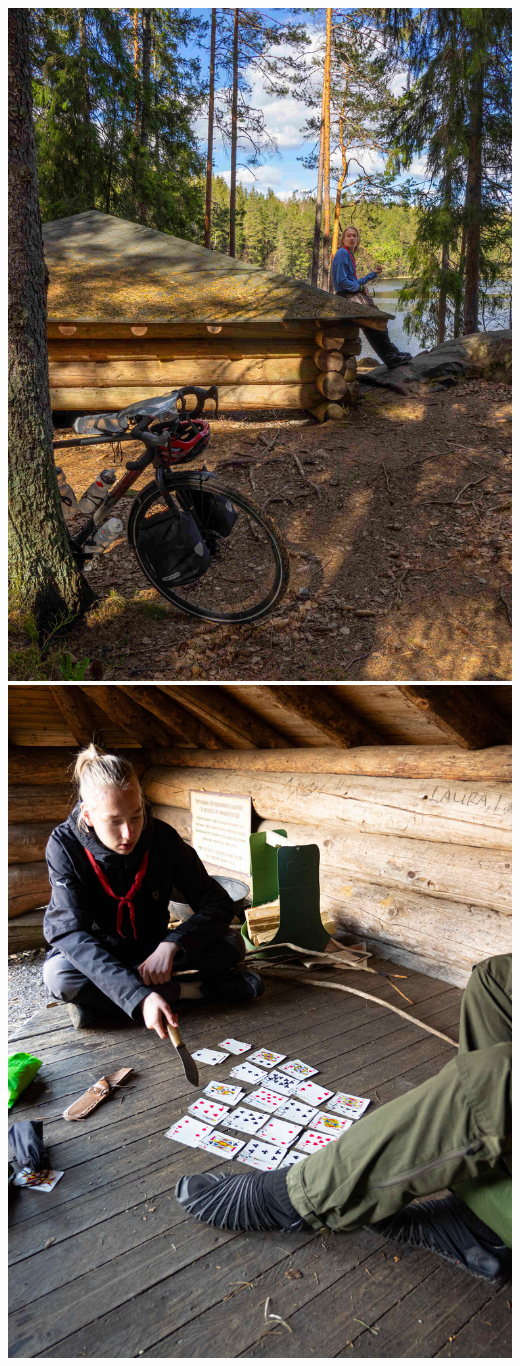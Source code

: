 \documentclass[10pt,finnish,a5paper,twoside=semi]{scrartcl}
\begin{document}
\begin{multicols}{2}
\begin{center}
		\noindent\includegraphics[width=1.05\linewidth]{assets/pyörävaellus11}
		\noindent\includegraphics[width=1.05\linewidth]{assets/pyörävaellus15}

\end{center}
\end{multicols}
\end{document}
